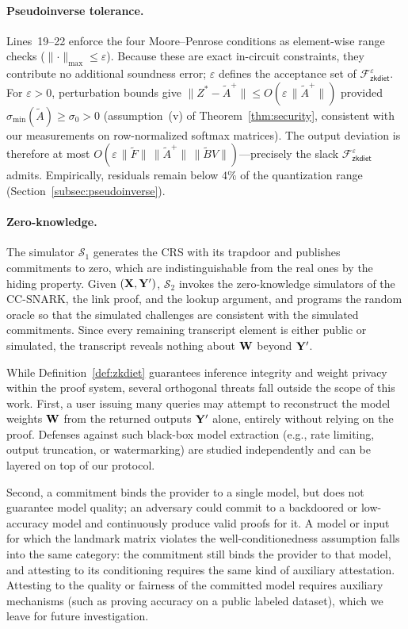 \documentclass[runningheads]{llncs}
\begin{document}
\paragraph{Pseudoinverse tolerance.}
Lines~19--22 enforce the four Moore--Penrose conditions as element-wise range checks ($\lVert\cdot\rVert_{\max}\leq\varepsilon$). Because these are exact in-circuit constraints, they contribute no additional soundness error; $\varepsilon$ defines the acceptance set of $\mathcal{F}^{\varepsilon}_{\mathsf{zkdiet}}$.
For $\varepsilon > 0$, perturbation bounds \cite{stewart1990matrix} give
$\|Z^{*} - \tilde{A}^{+}\| \le O(\varepsilon\,\|\tilde{A}^{+}\|)$
provided $\sigma_{\min}(\tilde{A}) \geq \sigma_0 > 0$
(assumption~(v) of Theorem~\ref{thm:security}, consistent with our measurements on row-normalized softmax matrices).
The output deviation is therefore at most
$O(\varepsilon\,\|\tilde{F}\|\,\|\tilde{A}^{+}\|\,\|\tilde{B}V\|)$---precisely the slack $\mathcal{F}^{\varepsilon}_{\mathsf{zkdiet}}$ admits. Empirically, residuals remain below $4\%$ of the quantization range (Section~\ref{subsec:pseudoinverse}).

\paragraph{Zero-knowledge.}
The simulator $\mathcal{S}_1$ generates the CRS with its trapdoor and publishes commitments to zero, which are indistinguishable from the real ones by the hiding property. Given $({\mathbf{X}}, {\mathbf{Y}}')$, $\mathcal{S}_2$ invokes the zero-knowledge simulators of the CC-SNARK, the link proof, and the lookup argument, and programs the random oracle so that the simulated challenges are consistent with the simulated commitments. Since every remaining transcript element is either public or simulated, the transcript reveals nothing about ${\mathbf{W}}$ beyond ${\mathbf{Y}}'$.

\label{subsec:out-of-scope}
While Definition~\ref{def:zkdiet} guarantees inference integrity and weight privacy within the proof system, several orthogonal threats fall outside the scope of this work. First, a user issuing many queries may attempt to reconstruct the model weights ${\mathbf{W}}$ from the returned outputs ${\mathbf{Y}}'$ alone, entirely without relying on the proof. Defenses against such black-box model extraction (e.g., rate limiting, output truncation, or watermarking) are studied independently and can be layered on top of our protocol.

Second, a commitment binds the provider to a single model, but does not guarantee model quality; an adversary could commit to a backdoored or low-accuracy model and continuously produce valid proofs for it. A model or input for which the landmark matrix violates the well-conditionedness assumption falls into the same category: the commitment still binds the provider to that model, and attesting to its conditioning requires the same kind of auxiliary attestation. Attesting to the quality or fairness of the committed model requires auxiliary mechanisms (such as proving accuracy on a public labeled dataset), which we leave for future investigation.
\end{document}
